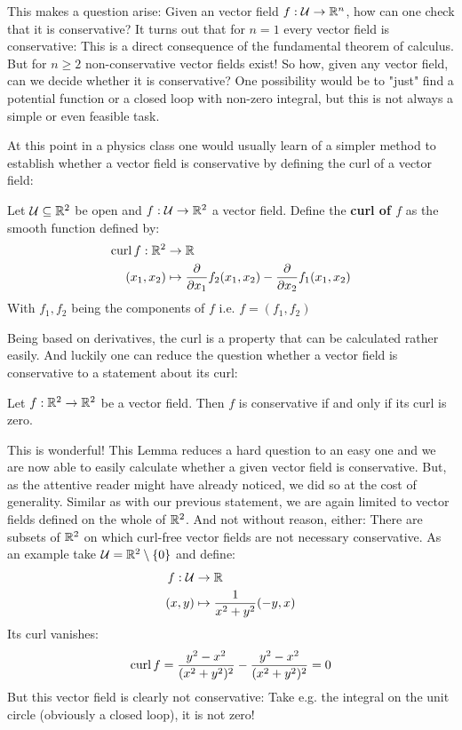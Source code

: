 This makes a question arise: Given an vector field $f: \mathcal{U} \to \mathbb{R}^n$, how can one check that it
is conservative? It turns out that for $n = 1$ every vector field is conservative: This is
a direct consequence of the fundamental theorem of calculus. But for $n \geq 2$ non-conservative vector
fields exist! So how, given any vector field, can we decide whether it is conservative? One possibility would
be to "just" find a potential function or a closed loop with non-zero integral, but this is not always a simple
or even feasible task.

At this point in a physics class one would usually learn of a simpler method to establish whether a vector field is
conservative by defining the curl of a vector field:
\begin{definition}
	Let $\mathcal{U} \subseteq \mathbb{R}^2$ be open and $f: \mathcal{U} \to \mathbb{R}^2$ a vector field. Define the \textbf{curl of $f$} as
	the smooth function defined by:
	\begin{align*}
		\operatorname{curl} f: \mathbb{R}^2 &\to \mathbb{R} \\
		 (x_1, x_2)
			&\mapsto \frac{\partial}{\partial x_1} f_2(x_1, x_2) - \frac{\partial}{\partial x_2} f_1(x_1, x_2)
	\end{align*}
	With $f_1, f_2$ being the components of $f$ i.e. $f = (f_1, f_2)$
\end{definition}
Being based on derivatives, the curl is a property that can be calculated rather easily. And luckily one
can reduce the question whether a vector field is conservative to a statement about its curl:
\begin{lemma}
Let $f: \mathbb{R}^2 \to \mathbb{R}^2$ be a vector field. Then $f$ is conservative if and only if its curl is zero.
\end{lemma}

This is wonderful! This Lemma reduces a hard question to an easy one and we are now able to easily calculate whether
a given vector field is conservative. But, as the attentive reader might have already noticed, we did so at the cost of generality.
Similar as with our previous statement, we are again limited to vector fields defined on the whole of $\mathbb{R}^2$.
And not without reason, either: There are subsets of $\mathbb{R}^2$ on which curl-free vector fields are not necessary conservative.
As an example take $\mathcal{U} = \mathbb{R}^2 \setminus \{0\}$ and define:
\begin{align*}
	f: \mathcal{U} &\to \mathbb{R} \\
		(x, y) &\mapsto \frac{1}{x^2 + y^2}(-y, x)
\end{align*}
Its curl vanishes:
\begin{align*}
	\operatorname{curl} f = \frac{y^2 - x^2}{(x^2 + y^2)^2} - \frac{y^2 - x^2}{(x^2 + y^2)^2} = 0
\end{align*}
But this vector field is clearly not conservative: Take e.g. the integral on the unit circle (obviously a closed
loop), it is not zero!

